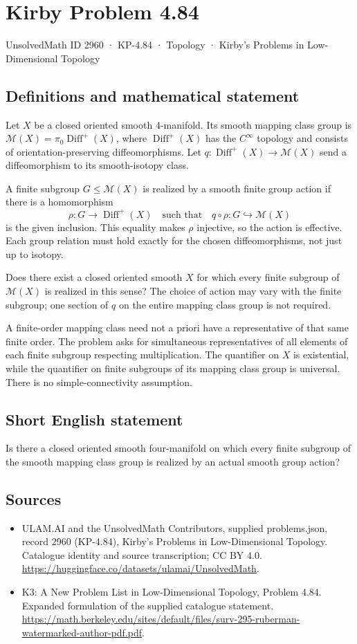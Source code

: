 \documentclass[11pt,a4paper]{article}
\begin{document}
\section*{Kirby Problem 4.84}\label{2960}
{\small UnsolvedMath ID 2960 · KP-4.84 · Topology · Kirby's Problems in Low-Dimensional Topology}
\subsection{Definitions and mathematical statement}
Let $X$ be a closed oriented smooth $4$-manifold. Its smooth
mapping class group is
$\mathcal M(X)=\pi_0\operatorname{Diff}^+(X)$, where
$\operatorname{Diff}^+(X)$ has the $C^\infty$ topology and consists
of orientation-preserving diffeomorphisms. Let
$q:\operatorname{Diff}^+(X)\to\mathcal M(X)$ send a diffeomorphism
to its smooth-isotopy class.

A finite subgroup $G\le\mathcal M(X)$ is realized by a smooth
finite group action if there is a homomorphism
\[
 \rho:G\longrightarrow\operatorname{Diff}^+(X)
       \quad\text{such that}\quad q\circ\rho:G\hookrightarrow\mathcal M(X)
\]
is the given inclusion. This equality makes $\rho$ injective,
so the action is effective. Each group relation must hold exactly
for the chosen diffeomorphisms, not just up to isotopy.

Does there exist a closed oriented smooth $X$ for which every
finite subgroup of $\mathcal M(X)$ is realized in this sense?
The choice of action may vary with the finite subgroup; one
section of $q$ on the entire mapping class group is not required.

A finite-order mapping class need not a priori have a representative
of that same finite order. The problem asks for simultaneous
representatives of all elements of each finite subgroup respecting
multiplication. The quantifier on $X$ is existential, while the
quantifier on finite subgroups of its mapping class group is
universal. There is no simple-connectivity assumption.
\subsection{Short English statement}
Is there a closed oriented smooth four-manifold on which every finite subgroup of the smooth mapping class group is realized by an actual smooth group action?
\subsection{Sources}
\begin{itemize}
\item[S1] ULAM.AI and the UnsolvedMath Contributors, supplied problems.json, record 2960 (KP-4.84), Kirby's Problems in Low-Dimensional Topology. Catalogue identity and source transcription; CC BY 4.0.
\url{https://huggingface.co/datasets/ulamai/UnsolvedMath}.
\item[S2] K3: A New Problem List in Low-Dimensional Topology, Problem 4.84. Expanded formulation of the supplied catalogue statement.
\url{https://math.berkeley.edu/sites/default/files/surv-295-ruberman-watermarked-author-pdf.pdf}.
\end{itemize}
\end{document}
